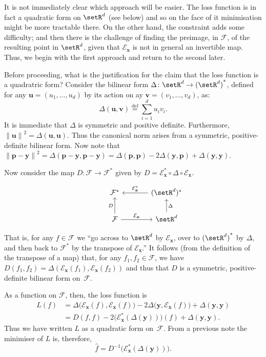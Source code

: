 \documentclass[10pt, a4paper]{article}
\newcommand{\isdef}{\stackrel{\text{def}}{=}}
\newcommand{\evalmap}{\mathcal{E}_{\bm{x}}}
\begin{document}
It is not immediately clear which approach will be easier. The loss
function is in fact a quadratic form on $\setR^d$ (see below) and so
on the face of it minimisation might be more tractable there. On the
other hand, the constraint adds some difficulty; and then there is the
challenge of finding the preimage, in $\mathcal{F}$, of the resulting point in
$\setR^d$, given that $\evalmap$ is not in general an invertible
map. Thus, we begin with the first approach and return to the second
later.

Before proceeding, what is the justification for the claim that the
loss function is a quadratric form? Consider the bilinear form
$\Delta\colon \setR^d\to{(\setR^d)}^*$, defined for any
$\bm{u}=(u_1, \dotsc, u_d)$ by its action on ay
$\bm{v}=(v_1,\dotsc, v_d)$, as:
\[
  \Delta(\bm{u}, \bm{v}) \isdef \sum_{i=1}^d u_i v_i.
\]
It is immediate that $\Delta$ is symmetric and positive
definite. Furthermore,
${\lVert \bm{u} \rVert}^2 = \Delta(\bm{u}, \bm{u})$. Thus the canonical
norm arises from a symmetric, positive-definite bilinear form. Now
note that
${\lVert \bm{p}-\bm{y}\rVert}^2 = \Delta(\bm{p}-\bm{y}, \bm{p}-\bm{y}) =
\Delta(\bm{p}, \bm{p})-2 \Delta(\bm{y}, \bm{p}) + \Delta(\bm{y}, \bm{y})$.

Now consider the map $D:\mathcal{F}\to\mathcal{F}^*$ given by
$D = \evalmap^* \circ \Delta \circ \evalmap$.
\begin{marginfigure}
  \[\begin{tikzcd}[column sep=large]
      & \mathcal{F}^*  & (\setR^d)^* \arrow[l, "\evalmap^*"'] \\
      & \mathcal{F} \arrow[u, "D"] \arrow[r, "\evalmap"] & \setR^d \arrow[u,
      "\Delta"'] 
      \end{tikzcd}\]
\end{marginfigure}  
That is, for any
$f\in\mathcal{F}$ we “go across to $\setR^d$ by $\evalmap$, over to
${(\setR^d)}^*$ by $\Delta$, and then back to $\mathcal{F}^*$ by the transpose of
$\evalmap$.” It follows (from the definition of the transpose of a map)
that, for any $f_1,f_2\in\mathcal{F}$, we have
$D(f_1,f_2) = \Delta(\evalmap(f_1), \evalmap(f_2))$ and thus that $D$ is a
symmetric, positive-definite bilinear form on~$\mathcal{F}$.

As a function on $\mathcal{F}$, then, the loss function is
\[
  \begin{aligned}
    L(f)
    & =  \Delta\bigl(\evalmap(f), \evalmap(f)\bigr)-2 \Delta\bigl(\bm{y}, \evalmap(f)\bigr) +
      \Delta(\bm{y}, \bm{y}) \\
    & = D(f, f) - 2 \bigl(\evalmap^*(\Delta(\bm{y}))\bigr)(f) + \Delta(\bm{y}, \bm{y}).
  \end{aligned}
\]
Thus we have written $L$ as a quadratic form on~$\mathcal{F}$. From a previous
note the minimiser of $L$ is, therefore,
\[
\hat{f} = D^{-1}\bigl(\evalmap^*(\Delta(\bm{y}))\bigr).
\]
\end{document}
